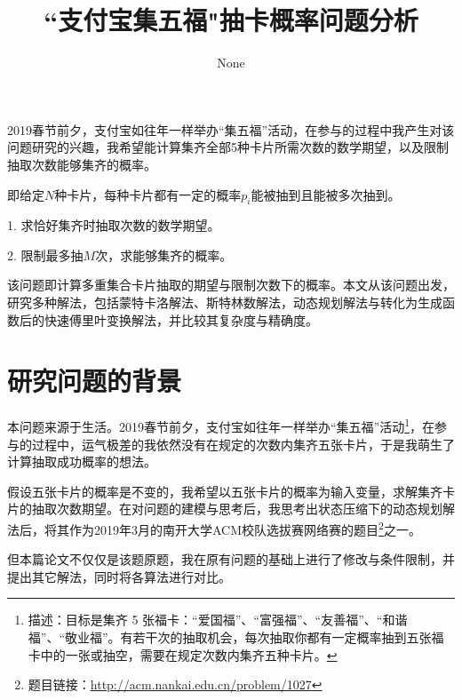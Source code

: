 \documentclass[master]{thesis-uestc}
\title{``支付宝集五福"抽卡概率问题分析}
\author{None}
\begin{document}
\makecover

\begin{chineseabstract}
    

    2019春节前夕，支付宝如往年一样举办“集五福”活动，在参与的过程中我产生对该问题研究的兴趣，我希望能计算集齐全部5种卡片所需次数的数学期望，以及限制抽取次数能够集齐的概率。
    
    即给定$N$种卡片，每种卡片都有一定的概率$p_i$能被抽到且能被多次抽到。
    
    1. 求恰好集齐时抽取次数的数学期望。

    2. 限制最多抽$M$次，求能够集齐的概率。

    该问题即计算多重集合卡片抽取的期望与限制次数下的概率。本文从该问题出发，研究多种解法，包括蒙特卡洛解法、斯特林数解法，动态规划解法与转化为生成函数后的快速傅里叶变换解法，并比较其复杂度与精确度。

\end{chineseabstract}

\thesistableofcontents

\thesischapterexordium

\section{研究问题的背景}

本问题来源于生活。2019春节前夕，支付宝如往年一样举办“集五福”活动\footnote{描述：目标是集齐 5 张福卡：“爱国福”、“富强福”、“友善福”、“和谐福”、“敬业福”。有若干次的抽取机会，每次抽取你都有一定概率抽到五张福卡中的一张或抽空，需要在规定次数内集齐五种卡片。}，在参与的过程中，运气极差的我依然没有在规定的次数内集齐五张卡片，于是我萌生了计算抽取成功概率的想法。

假设五张卡片的概率是不变的，我希望以五张卡片的概率为输入变量，求解集齐卡片的抽取次数期望。在对问题的建模与思考后，我思考出状态压缩下的动态规划解法后，将其作为2019年3月的南开大学ACM校队选拔赛网络赛的题目\footnote{题目链接：\url{http://acm.nankai.edu.cn/problem/1027}}之一。

但本篇论文不仅仅是该题原题，我在原有问题的基础上进行了修改与条件限制，并提出其它解法，同时将各算法进行对比。


\end{document}
